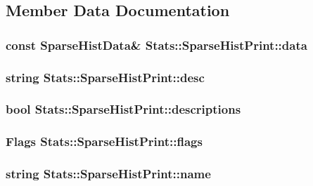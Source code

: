 \subsection{Member Data Documentation}
\hypertarget{structStats_1_1SparseHistPrint_acc3e076566384cb5a9532b679cfe8a6c}{
\subsubsection[{data}]{\setlength{\rightskip}{0pt plus 5cm}const SparseHistData\& {\bf Stats::SparseHistPrint::data}}}
\label{structStats_1_1SparseHistPrint_acc3e076566384cb5a9532b679cfe8a6c}
\hypertarget{structStats_1_1SparseHistPrint_a8760dfb52afeeef275a09d0cce044a47}{
\subsubsection[{desc}]{\setlength{\rightskip}{0pt plus 5cm}string {\bf Stats::SparseHistPrint::desc}}}
\label{structStats_1_1SparseHistPrint_a8760dfb52afeeef275a09d0cce044a47}
\hypertarget{structStats_1_1SparseHistPrint_ab0ff8d6cc914db901ad23dc01738b772}{
\subsubsection[{descriptions}]{\setlength{\rightskip}{0pt plus 5cm}bool {\bf Stats::SparseHistPrint::descriptions}}}
\label{structStats_1_1SparseHistPrint_ab0ff8d6cc914db901ad23dc01738b772}
\hypertarget{structStats_1_1SparseHistPrint_a7d6cd92b10d6e566b1cb5602179ae7be}{
\subsubsection[{flags}]{\setlength{\rightskip}{0pt plus 5cm}Flags {\bf Stats::SparseHistPrint::flags}}}
\label{structStats_1_1SparseHistPrint_a7d6cd92b10d6e566b1cb5602179ae7be}
\hypertarget{structStats_1_1SparseHistPrint_ab767d5886007c432b86a42171f7e1206}{
\subsubsection[{name}]{\setlength{\rightskip}{0pt plus 5cm}string {\bf Stats::SparseHistPrint::name}}}
